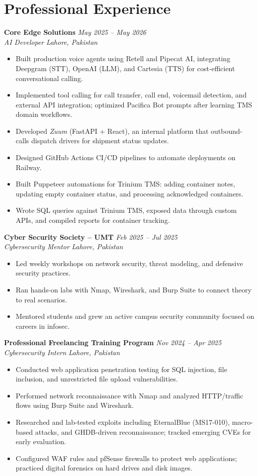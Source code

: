 \documentclass[11pt,a4paper]{article}
\newcommand{\resumeSubheading}[4]{%
  \textbf{#1} \hfill \textit{#2} \\
  \textit{#3} \hfill \textit{#4} \\
}
\newcommand{\resumeItemList}{\begin{itemize}[leftmargin=*, nosep, topsep=2pt]}
\newcommand{\resumeItemListEnd}{\end{itemize}}
\begin{document}
\section{Professional Experience}

\resumeSubheading{Core Edge Solutions}{May 2025 -- May 2026}{AI Developer}{Lahore, Pakistan}
\resumeItemList
  \item Built production voice agents using Retell and Pipecat AI, integrating Deepgram (STT), OpenAI (LLM), and Cartesia (TTS) for cost-efficient conversational calling.
  \item Implemented tool calling for call transfer, call end, voicemail detection, and external API integration; optimized Pacifica Bot prompts after learning TMS domain workflows.
  \item Developed \textit{Zuum} (FastAPI + React), an internal platform that outbound-calls dispatch drivers for shipment status updates.
  \item Designed GitHub Actions CI/CD pipelines to automate deployments on Railway.
  \item Built Puppeteer automations for Trinium TMS: adding container notes, updating empty container status, and processing acknowledged containers.
  \item Wrote SQL queries against Trinium TMS, exposed data through custom APIs, and compiled reports for container tracking.
\resumeItemListEnd

\vspace{4pt}

\resumeSubheading{Cyber Security Society -- UMT}{Feb 2025 -- Jul 2025}{Cybersecurity Mentor}{Lahore, Pakistan}
\resumeItemList
  \item Led weekly workshops on network security, threat modeling, and defensive security practices.
  \item Ran hands-on labs with Nmap, Wireshark, and Burp Suite to connect theory to real scenarios.
  \item Mentored students and grew an active campus security community focused on careers in infosec.
\resumeItemListEnd

\vspace{4pt}

\resumeSubheading{Professional Freelancing Training Program}{Nov 2024 -- Apr 2025}{Cybersecurity Intern}{Lahore, Pakistan}
\resumeItemList
  \item Conducted web application penetration testing for SQL injection, file inclusion, and unrestricted file upload vulnerabilities.
  \item Performed network reconnaissance with Nmap and analyzed HTTP/traffic flows using Burp Suite and Wireshark.
  \item Researched and lab-tested exploits including EternalBlue (MS17-010), macro-based attacks, and GHDB-driven reconnaissance; tracked emerging CVEs for early evaluation.
  \item Configured WAF rules and pfSense firewalls to protect web applications; practiced digital forensics on hard drives and disk images.
\resumeItemListEnd
\end{document}
